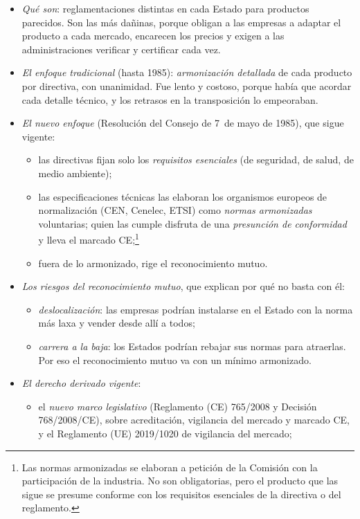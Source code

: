 \documentclass[11pt]{article}
\begin{document}
\begin{itemize}
\item \emph{Qué son}: reglamentaciones distintas en cada Estado para productos parecidos. Son las más dañinas, porque obligan a las empresas a adaptar el producto a cada mercado, encarecen los precios y exigen a las administraciones verificar y certificar cada vez.
\item \emph{El enfoque tradicional} (hasta 1985): \emph{armonización detallada} de cada producto por directiva, con unanimidad. Fue lento y costoso, porque había que acordar cada detalle técnico, y los retrasos en la transposición lo empeoraban.
\item \emph{El nuevo enfoque} (Resolución del Consejo de 7~de mayo de 1985), que sigue vigente:
  \begin{itemize}
  \item las directivas fijan solo los \emph{requisitos esenciales} (de seguridad, de salud, de medio ambiente);
  \item las especificaciones técnicas las elaboran los organismos europeos de normalización (CEN, Cenelec, ETSI) como \emph{normas armonizadas} voluntarias; quien las cumple disfruta de una \emph{presunción de conformidad} y lleva el marcado CE;\footnote{Las normas armonizadas se elaboran a petición de la Comisión con la participación de la industria. No son obligatorias, pero el producto que las sigue se presume conforme con los requisitos esenciales de la directiva o del reglamento.}
  \item fuera de lo armonizado, rige el reconocimiento mutuo.
  \end{itemize}
\item \emph{Los riesgos del reconocimiento mutuo}, que explican por qué no basta con él:
  \begin{itemize}
  \item \emph{deslocalización}: las empresas podrían instalarse en el Estado con la norma más laxa y vender desde allí a todos;
  \item \emph{carrera a la baja}: los Estados podrían rebajar sus normas para atraerlas. Por eso el reconocimiento mutuo va con un mínimo armonizado.
  \end{itemize}
\item \emph{El derecho derivado vigente}\nocite{UE2019Reconocimiento,UE2015TRIS}:
  \begin{itemize}
  \item el \emph{nuevo marco legislativo} (Reglamento (CE) 765/2008 y Decisión 768/2008/CE), sobre acreditación, vigilancia del mercado y marcado CE, y el Reglamento (UE) 2019/1020 de vigilancia del mercado;

\end{itemize}
\end{itemize}
\end{document}
